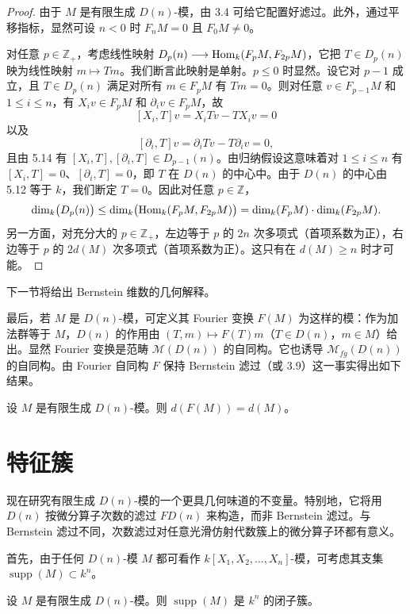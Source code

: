 \begin{proof}
由于 $M$ 是有限生成 $D(n)$-模，由 3.4 可给它配置好滤过。此外，通过平移指标，显然可设 $n<0$ 时 $F_n M=0$ 且 $F_0 M\neq 0$。

对任意 $p\in\mathbb{Z}_+$，考虑线性映射 $D_p(n)\longrightarrow\operatorname{Hom}_k(F_p M,F_{2p}M)$，它把 $T\in D_p(n)$ 映为线性映射 $m\longmapsto Tm$。我们断言此映射是单射。$p\le 0$ 时显然。设它对 $p-1$ 成立，且 $T\in D_p(n)$ 满足对所有 $m\in F_p M$ 有 $Tm=0$。则对任意 $v\in F_{p-1}M$ 和 $1\le i\le n$，有 $X_i v\in F_p M$ 和 $\partial_i v\in F_p M$，故
$$[X_i,T]v=X_iTv-TX_iv=0$$
以及
$$[\partial_i,T]v=\partial_i T v-T\partial_i v=0,$$
且由 5.14 有 $[X_i,T],[\partial_i,T]\in D_{p-1}(n)$。由归纳假设这意味着对 $1\le i\le n$ 有 $[X_i,T]=0$、$[\partial_i,T]=0$，即 $T$ 在 $D(n)$ 的中心中。由于 $D(n)$ 的中心由 5.12 等于 $k$，我们断定 $T=0$。因此对任意 $p\in\mathbb{Z}$，
$$\dim_k\bigl(D_p(n)\bigr)\le\dim_k\bigl(\operatorname{Hom}_k(F_p M,F_{2p}M)\bigr)=\dim_k(F_p M)\cdot\dim_k(F_{2p}M).$$
另一方面，对充分大的 $p\in\mathbb{Z}_+$，左边等于 $p$ 的 $2n$ 次多项式（首项系数为正），右边等于 $p$ 的 $2d(M)$ 次多项式（首项系数为正）。这只有在 $d(M)\ge n$ 时才可能。
\end{proof}

下一节将给出 Bernstein 维数的几何解释。

最后，若 $M$ 是 $D(n)$-模，可定义其 Fourier 变换 $F(M)$ 为这样的模：作为加法群等于 $M$，$D(n)$ 的作用由 $(T,m)\longmapsto F(T)m$（$T\in D(n)$，$m\in M$）给出。显然 Fourier 变换是范畴 $\mathcal{M}(D(n))$ 的自同构。它也诱导 $\mathcal{M}_{fg}(D(n))$ 的自同构。由 Fourier 自同构 $F$ 保持 Bernstein 滤过（或 3.9）这一事实得出如下结果。

\begin{lemma}
设 $M$ 是有限生成 $D(n)$-模。则 $d(F(M))=d(M)$。
\end{lemma}

\section{特征簇}

现在研究有限生成 $D(n)$-模的一个更具几何味道的不变量。特别地，它将用 $D(n)$ 按微分算子次数的滤过 $F D(n)$ 来构造，而非 Bernstein 滤过。与 Bernstein 滤过不同，次数滤过对任意光滑仿射代数簇上的微分算子环都有意义。

首先，由于任何 $D(n)$-模 $M$ 都可看作 $k[X_1,X_2,\dots,X_n]$-模，可考虑其支集 $\operatorname{supp}(M)\subset k^n$。

\begin{proposition}
设 $M$ 是有限生成 $D(n)$-模。则 $\operatorname{supp}(M)$ 是 $k^n$ 的闭子簇。
\end{proposition}

